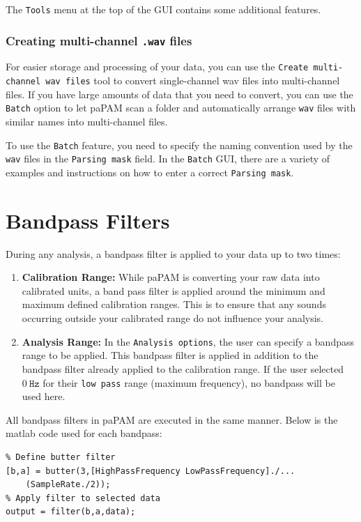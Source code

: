 \documentclass[11pt]{report}
\begin{document}
The \texttt{Tools} menu at the top of the GUI contains some additional features.

\subsubsection{Creating multi-channel \texttt{.wav} files} \label{CreatingMultiChannelWavFiles}


For easier storage and processing of your data, you can use the \texttt{Create multi-channel wav files} tool to convert single-channel wav files into multi-channel files.
If you have large amounts of data that you need to convert, you can use the \texttt{Batch} option to let paPAM scan a folder and automatically arrange \texttt{wav} files with similar names into multi-channel files.

To use the \texttt{Batch} feature, you need to specify the naming convention used by the \texttt{wav} files in the \texttt{Parsing mask} field.  In the \texttt{Batch} GUI, there are a variety of examples and instructions on how to enter a correct \texttt{Parsing mask}.

\section{Bandpass Filters} \label{BandpassFilters}

During any analysis, a bandpass filter is applied to your data up to two times:
\begin{enumerate}
\item \textbf{Calibration Range:}  While paPAM is converting your raw data into calibrated units, a band pass filter is applied around the minimum and maximum defined calibration ranges.  This is to ensure that any sounds occurring outside your calibrated range do not influence your analysis.
\item \textbf{Analysis Range:} In the \texttt{Analysis options}, the user can specify a bandpass range to be applied.  This bandpass filter is applied in addition to the bandpass filter already applied to the calibration range.  If the user selected $0 \ \mathtt{Hz}$ for their \texttt{low pass} range (maximum frequency), no bandpass will be used here.
\end{enumerate}
\begin{samepage}
All bandpass filters in paPAM are executed in the same manner.  Below is the matlab code used for each bandpass:

\begin{lstlisting}
% Define butter filter
[b,a] = butter(3,[HighPassFrequency LowPassFrequency]./...
	(SampleRate./2));
% Apply filter to selected data
output = filter(b,a,data);
\end{lstlisting}
\end{samepage}
\end{document}
